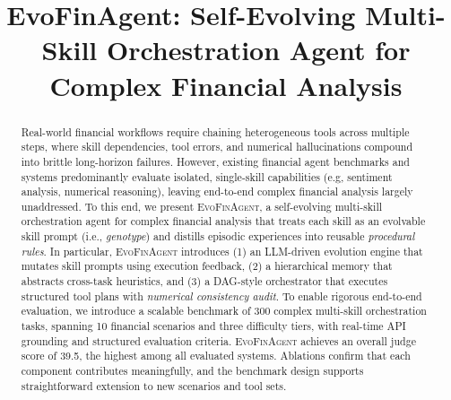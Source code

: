 \documentclass{article}
\title{EvoFinAgent: Self-Evolving Multi-Skill Orchestration Agent for Complex Financial Analysis}
\author{%
}
\begin{document}
\maketitle

\begin{abstract}

Real-world financial workflows require chaining heterogeneous tools across multiple steps, where skill dependencies, tool errors, and numerical hallucinations compound into brittle long-horizon failures.
However, existing financial agent benchmarks and systems predominantly evaluate isolated, single-skill capabilities (e.g, sentiment analysis, numerical reasoning), leaving end-to-end complex financial analysis largely unaddressed. 
To this end, we present \textsc{EvoFinAgent}, a self-evolving multi-skill orchestration agent for complex financial analysis that treats each skill as an evolvable skill prompt (i.e., \emph{genotype}) and distills episodic experiences into reusable \emph{procedural rules}.
In particular, \textsc{EvoFinAgent} introduces (1) an LLM-driven evolution engine that mutates skill prompts using execution feedback, (2) a hierarchical memory that abstracts cross-task heuristics, and (3) a DAG-style orchestrator that executes structured tool plans with \emph{numerical consistency audit}.
To enable rigorous end-to-end evaluation, we introduce a scalable benchmark of 300 complex multi-skill orchestration tasks, spanning 10 financial scenarios and three difficulty tiers, with real-time API grounding and structured evaluation criteria. 
\textsc{EvoFinAgent} achieves an overall judge score of 39.5, the highest among all evaluated systems. Ablations confirm that each component contributes meaningfully, and the benchmark design supports straightforward extension to new scenarios and tool sets.


\end{abstract}
\end{document}
